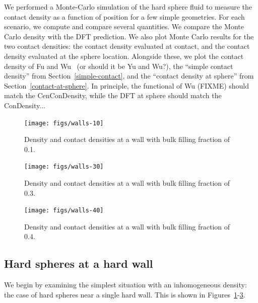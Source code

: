 \documentclass[letterpaper,twocolumn,amsmath,amssymb,prb]{revtex4-1}
\begin{document}
We performed a Monte-Carlo simulation of the hard sphere fluid to
measure the contact density as a function of position for a few simple
geometries.  For each scenario, we compute and compare several
quantities.  We compare the Monte Carlo density with the DFT
prediction.  We also plot Monte Carlo results for the two contact
densities: the contact density evaluated at contact, and the contact
density evaluated at the sphere location.  Alongside these, we plot
the contact density of Fu and Wu~\cite{fu2005vapor-liquid-dft} (or
should it be Yu and Wu\cite{yu2002structures,
  yu2002fmt-dft-inhomogeneous-associating}?), the ``simple contact
density'' from Section~\ref{simple-contact}, and the ``contact density
at sphere'' from Section~\ref{contact-at-sphere}.  In principle, the
functional of Wu (FIXME) should match the CenConDensity, while the DFT
at sphere should match the ConDensity...

\begin{figure}
  \texttt{[image: figs/walls-10]}
  \caption{Density and contact densities at a wall with bulk filling
    fraction of 0.1.}
  \label{fig:walls-10}
\end{figure}

\begin{figure}
  \texttt{[image: figs/walls-30]}
  \caption{Density and contact densities at a wall with bulk filling
    fraction of 0.3.}
  \label{fig:walls-30}
\end{figure}

\begin{figure}
  \texttt{[image: figs/walls-40]}
  \caption{Density and contact densities at a wall with bulk filling
    fraction of 0.4.}
  \label{fig:walls-40}
\end{figure}

\subsection{Hard spheres at a hard wall}

We begin by examining the simplest situation with an inhomogeneous
density:  the case of hard spheres near a single hard wall.  This is
shown in Figures~\ref{fig:walls-10}-\ref{fig:walls-40}.



\newcommand\sphereExplanation{ Blue curves describe the density of
  hard spheres.  Green curves describe the contact density averaged
  according to the point of contact.  Red curves describe the contact
  density as averaged according to the centers of the spheres that are
  touching.  In each case, solid lines correspond to the Monte Carlo
  simulation, and dashed lines of various sorts represent DFT model
  predictions.  }
\end{document}
